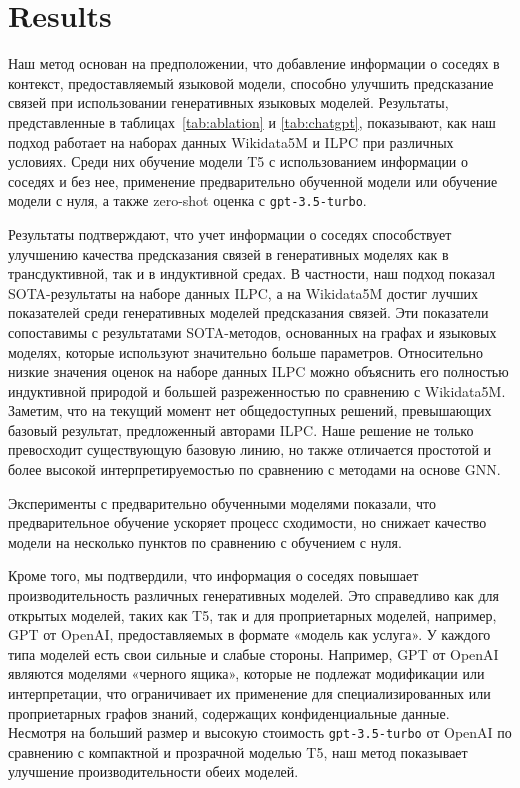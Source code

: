 \section{Results}


Наш метод основан на предположении, что добавление информации о соседях в контекст, предоставляемый языковой модели, способно улучшить предсказание связей при использовании генеративных языковых моделей. Результаты, представленные в таблицах~\ref{tab:ablation} и \ref{tab:chatgpt}, показывают, как наш подход работает на наборах данных Wikidata5M и ILPC при различных условиях. Среди них обучение модели T5 с использованием информации о соседях и без нее, применение предварительно обученной модели или обучение модели с нуля, а также zero-shot оценка с \texttt{gpt-3.5-turbo}.

Результаты подтверждают, что учет информации о соседях способствует улучшению качества предсказания связей в генеративных моделях как в трансдуктивной, так и в индуктивной средах. В частности, наш подход показал SOTA-результаты на наборе данных ILPC, а на Wikidata5M достиг лучших показателей среди генеративных моделей предсказания связей. Эти показатели сопоставимы с результатами SOTA-методов, основанных на графах и языковых моделях, которые используют значительно больше параметров. Относительно низкие значения оценок на наборе данных ILPC можно объяснить его полностью индуктивной природой и большей разреженностью по сравнению с Wikidata5M. Заметим, что на текущий момент нет общедоступных решений, превышающих базовый результат, предложенный авторами ILPC. Наше решение не только превосходит существующую базовую линию, но также отличается простотой и более высокой интерпретируемостью по сравнению с методами на основе GNN.

Эксперименты с предварительно обученными моделями показали, что предварительное обучение ускоряет процесс сходимости, но снижает качество модели на несколько пунктов по сравнению с обучением с нуля.

Кроме того, мы подтвердили, что информация о соседях повышает производительность различных генеративных моделей. Это справедливо как для открытых моделей, таких как T5, так и для проприетарных моделей, например, GPT от OpenAI, предоставляемых в формате «модель как услуга». У каждого типа моделей есть свои сильные и слабые стороны. Например, GPT от OpenAI являются моделями «черного ящика», которые не подлежат модификации или интерпретации, что ограничивает их применение для специализированных или проприетарных графов знаний, содержащих конфиденциальные данные. Несмотря на больший размер и высокую стоимость \texttt{gpt-3.5-turbo} от OpenAI по сравнению с компактной и прозрачной моделью T5, наш метод показывает улучшение производительности обеих моделей.

